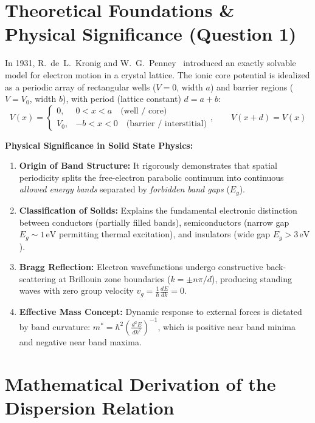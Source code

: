 \documentclass[10pt, a4paper]{article}
\begin{document}
\section{Theoretical Foundations \& Physical Significance (Question 1)}

In 1931, R.~de~L.~Kronig and W.~G.~Penney~\cite{kronig1931} introduced an exactly solvable model for electron motion in a crystal lattice. The ionic core potential is idealized as a periodic array of rectangular wells ($V=0$, width $a$) and barrier regions ($V=V_0$, width $b$), with period (lattice constant) $d = a+b$:
\begin{equation}
V(x) = \begin{cases} 0, & 0 < x < a \quad \text{(well / core)} \\ V_0, & -b < x < 0 \quad \text{(barrier / interstitial)} \end{cases}, \qquad V(x + d) = V(x)
\label{eq:potential}
\end{equation}

\textbf{Physical Significance in Solid State Physics:}
\begin{enumerate}\setlength{\itemsep}{0pt}\setlength{\parskip}{0.5pt}
    \item \textbf{Origin of Band Structure:} It rigorously demonstrates that spatial periodicity splits the free-electron parabolic continuum into continuous \textit{allowed energy bands} separated by \textit{forbidden band gaps} ($E_g$).
    \item \textbf{Classification of Solids:} Explains the fundamental electronic distinction between conductors (partially filled bands), semiconductors (narrow gap $E_g \sim 1\,\text{eV}$ permitting thermal excitation), and insulators (wide gap $E_g > 3\,\text{eV}$).
    \item \textbf{Bragg Reflection:} Electron wavefunctions undergo constructive back-scattering at Brillouin zone boundaries ($k = \pm n\pi/d$), producing standing waves with zero group velocity $v_g = \frac{1}{\hbar}\frac{dE}{dk} = 0$.
    \item \textbf{Effective Mass Concept:} Dynamic response to external forces is dictated by band curvature: $m^* = \hbar^2\left(\frac{d^2E}{dk^2}\right)^{-1}$, which is positive near band minima and negative near band maxima.
\end{enumerate}

\section{Mathematical Derivation of the Dispersion Relation}
\end{document}
